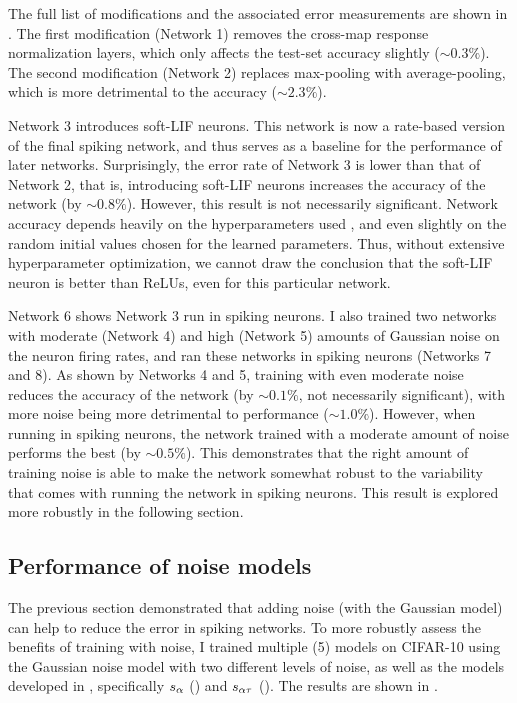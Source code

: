 The full list of modifications and the associated error measurements
are shown in .
The first modification (Network 1) removes the cross-map response normalization layers,
which only affects the test-set accuracy slightly ($\sim 0.3\%$).
The second modification (Network 2) replaces max-pooling with average-pooling,
which is more detrimental to the accuracy ($\sim 2.3\%$).

Network 3 introduces soft-LIF neurons.
This network is now a rate-based version of the final spiking network,
and thus serves as a baseline for the performance of later networks.
Surprisingly, the error rate of Network 3 is lower than that of Network 2,
that is, introducing soft-LIF neurons increases the accuracy of the network (by $\sim 0.8\%$).
However, this result is not necessarily significant.
Network accuracy depends heavily on the hyperparameters used \parencite{Bergstra2012},
and even slightly on the random initial values chosen for the learned parameters.
Thus, without extensive hyperparameter optimization,
we cannot draw the conclusion that the soft-LIF neuron is better than ReLUs,
even for this particular network.

Network 6 shows Network 3 run in spiking neurons.
I also trained two networks with moderate (Network 4) and high (Network 5)
amounts of Gaussian noise on the neuron firing rates,
and ran these networks in spiking neurons (Networks 7 and 8).
As shown by Networks 4 and 5,
training with even moderate noise reduces the accuracy of the network
(by $\sim 0.1\%$, not necessarily significant),
with more noise being more detrimental to performance ($\sim 1.0\%$).
However, when running in spiking neurons,
the network trained with a moderate amount of noise performs the best
(by $\sim 0.5\%$).
This demonstrates that the right amount of training noise
is able to make the network somewhat robust to the variability that
comes with running the network in spiking neurons.
This result is explored more robustly in the following section.


\subsection{Performance of noise models}

The previous section demonstrated that adding noise (with the Gaussian model)
can help to reduce the error in spiking networks.
To more robustly assess the benefits of training with noise,
I trained multiple (5) models on CIFAR-10 using the Gaussian noise model
with two different levels of noise,
as well as the models developed in ,
specifically $s_\alpha$ () and $s_{\alpha\tau}$ ().
The results are shown in .

